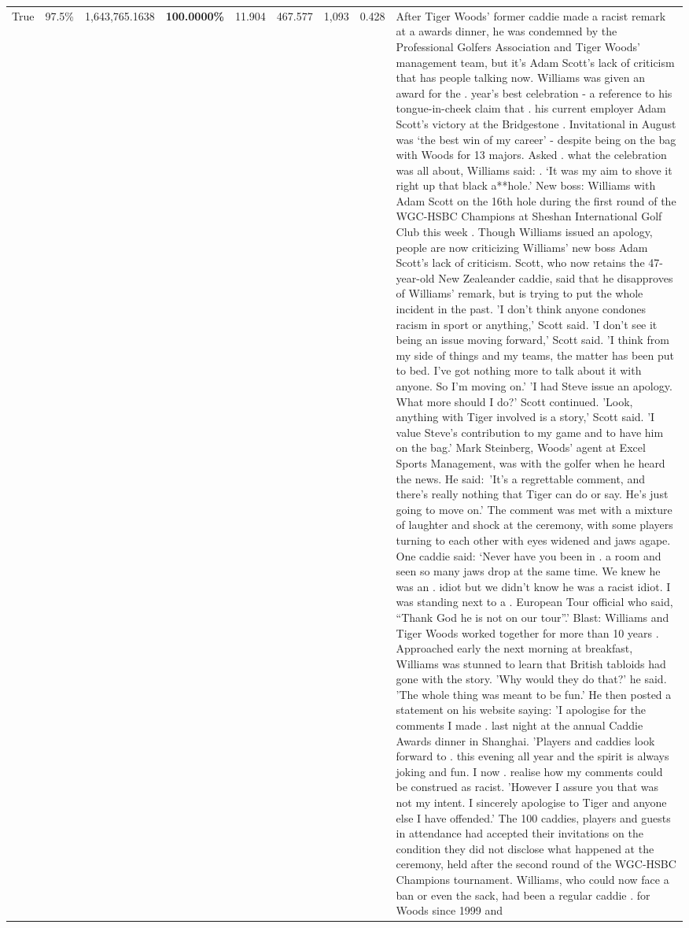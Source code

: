 \begin{table}[H]
\begin{tabular}{lllrlllll}
True & 97.5\% & 1,643,765.1638 & \bfseries \color{red} 100.0000\% & 11.904 & 467.577 & 1,093 & 0.428 & After Tiger Woods' former caddie made a racist remark at a awards dinner, he was condemned by the Professional Golfers Association and Tiger Woods' management team, but it's Adam Scott's lack of criticism that has people talking now. Williams was given an award for the . year’s best celebration - a reference to his tongue-in-cheek claim that . his current employer Adam Scott’s victory at the Bridgestone . Invitational in August was ‘the best win of my career’ - despite being on the bag with Woods for 13 majors. Asked . what the celebration was all about, Williams said: . ‘It was my aim to shove it right up that black a**hole.’ New boss: Williams with Adam Scott  on the 16th hole during the first round of the WGC-HSBC Champions at Sheshan International Golf Club this week . Though Williams issued an apology, people are now criticizing Williams' new boss Adam Scott's lack of criticism. Scott, who now retains the 47-year-old New Zealeander caddie, said that he disapproves of Williams' remark, but is trying to put the whole incident in the past. 'I don't think anyone condones racism in sport or anything,' Scott said. 'I don't see it being an issue moving forward,' Scott said. 'I think from my side of things and my teams, the matter has been put to bed. I've got nothing more to talk about it with anyone. So I'm moving on.' 'I had Steve issue an apology. What more should I do?' Scott continued. 'Look, anything with Tiger involved is a story,' Scott said. 'I value Steve's contribution to my game and to have him on the bag.' Mark Steinberg, Woods' agent at Excel Sports Management, was with the golfer when he heard the news. He said: 'It's a regrettable comment, and there's really nothing that Tiger can do or say. He's just going to move on.' The comment was met with a mixture of laughter and shock at the ceremony, with some players turning to each other with eyes widened and jaws agape. One caddie said: ‘Never have you been in . a room and seen so many jaws drop at the same time. We knew he was an . idiot but we didn’t know he was a racist idiot. I was standing next to a . European Tour official who said, “Thank God he is not on our tour”.’ Blast: Williams and Tiger Woods worked together for more than 10 years . Approached early the next morning at breakfast, Williams was stunned to learn that British tabloids had gone with the story. 'Why would they do that?' he said. 'The whole thing was meant to be fun.' He then posted a statement on his website saying: 'I apologise for the comments I made . last night at the annual Caddie Awards dinner in Shanghai. 'Players and caddies look forward to . this evening all year and the spirit is always joking and fun. I now . realise how my comments could be construed as racist. 'However I assure you that was not my intent. I sincerely apologise to Tiger and anyone else I have offended.' The 100 caddies, players and guests in attendance had accepted their invitations on the condition they did not disclose what happened at the ceremony, held after the second round of the WGC-HSBC Champions tournament. Williams, who could now face a ban or even the sack, had been a regular caddie . for Woods since 1999 and 
\end{tabular}
\end{table}
